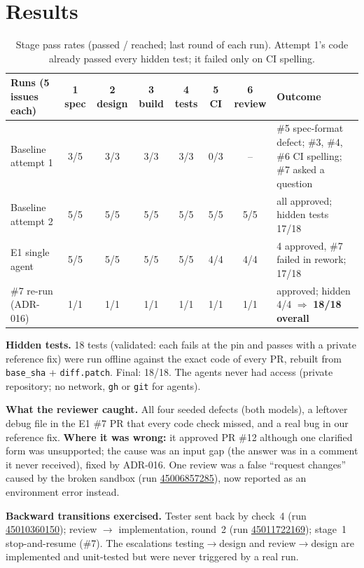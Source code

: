 \documentclass[10pt,a4paper]{article}
\newcommand{\run}[1]{\href{https://github.com/MittalManas2005/markdown/actions/runs/#1}{#1}}
\newcommand{\adr}[1]{ADR-#1}
\begin{document}
\section{Results}
\begin{table}[h]
\centering\footnotesize
\begin{tabularx}{\linewidth}{@{}l c c c c c c Y@{}}
\toprule
Runs (5 issues each) & 1 spec & 2 design & 3 build & 4 tests & 5 CI & 6 review & Outcome\\
\midrule
Baseline attempt 1 & 3/5 & 3/3 & 3/3 & 3/3 & 0/3 & -- & \#5 spec-format defect; \#3, \#4, \#6 CI spelling; \#7 asked a question\\
Baseline attempt 2 & 5/5 & 5/5 & 5/5 & 5/5 & 5/5 & 5/5 & all approved; hidden tests 17/18\\
E1 single agent & 5/5 & 5/5 & 5/5 & 5/5 & 4/4 & 4/4 & 4 approved, \#7 failed in rework; 17/18\\
\#7 re-run (\adr{016}) & 1/1 & 1/1 & 1/1 & 1/1 & 1/1 & 1/1 & approved; hidden 4/4 $\Rightarrow$ \textbf{18/18 overall}\\
\bottomrule
\end{tabularx}
\caption{Stage pass rates (passed / reached; last round of each run). Attempt 1's code already passed every hidden test;
it failed only on CI spelling.}
\end{table}

\textbf{Hidden tests.} 18 tests (validated: each fails at the pin and passes with a private reference fix) were run
offline against the exact code of every PR, rebuilt from \texttt{base\_sha} + \texttt{diff.patch}. Final: 18/18. The
agents never had access (private repository; no network, \texttt{gh} or \texttt{git} for agents).

\textbf{What the reviewer caught.} All four seeded defects (both models), a leftover debug file in the E1 \#7 PR that every
code check missed, and a real bug in our reference fix. \textbf{Where it was wrong:} it approved PR \#12 although one
clarified form was unsupported; the cause was an input gap (the answer was in a comment it never received), fixed by
\adr{016}. One review was a false ``request changes'' caused by the broken sandbox (run \run{45006857285}), now reported as
an environment error instead.

\textbf{Backward transitions exercised.} Tester sent back by check~4 (run \run{45010360150}); review $\rightarrow$
implementation, round~2 (run \run{45011722169}); stage~1 stop-and-resume (\#7). The escalations testing$\rightarrow$design
and review$\rightarrow$design are implemented and unit-tested but were never triggered by a real run.
\end{document}

